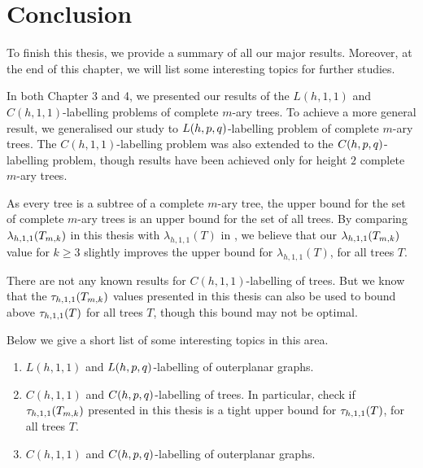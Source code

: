 \chapter{Conclusion}

To finish this thesis, we provide a summary of all our major results. Moreover, at the end of this chapter, we will list some interesting topics for further studies. 

In both Chapter 3 and 4, we presented our results of the $L(h,1,1)$ and $C(h,1,1)$-labelling problems of complete $m$-ary trees. To achieve a more general result, we generalised our study to $L(h,p,q)$-labelling problem of complete $m$-ary trees. The $C(h,1,1)$-labelling problem was also extended to the $C(h,p,q)$-labelling problem, though results have been achieved only for height $2$ complete $m$-ary trees. 

As every tree is a subtree of a complete $m$-ary tree, the upper bound for the set of complete $m$-ary trees is an upper bound for the set of all trees. By comparing $\lambda_{h,1,1}(T_{m,k})$ in this thesis with $\lambda_{h,1,1}(T)$ in \cite{zhou10}, we believe that our $\lambda_{h,1,1}(T_{m,k})$ value for $k \ge 3$ slightly improves the upper bound for $\lambda_{h,1,1}(T)$, for all trees $T$. 

There are not any known results for $C(h,1,1)$-labelling of trees. But we know that the $\tau_{h,1,1}(T_{m,k})$ values presented in this thesis can also be used to bound above $\tau_{h,1,1}(T)$ for all trees $T$, though this bound may not be optimal. 

Below we give a short list of some interesting topics in this area. 
\begin{enumerate}[(1)]
\item $L(h,1,1)$ and $L(h,p,q)$-labelling of outerplanar graphs. 
\item $C(h,1,1)$ and $C(h,p,q)$-labelling of trees. In particular, check if $\tau_{h,1,1}(T_{m,k})$ presented in this thesis is a tight upper bound for $\tau_{h,1,1}(T)$, for all trees $T$.
\item $C(h,1,1)$ and $C(h,p,q)$-labelling of outerplanar graphs. 
\end{enumerate}